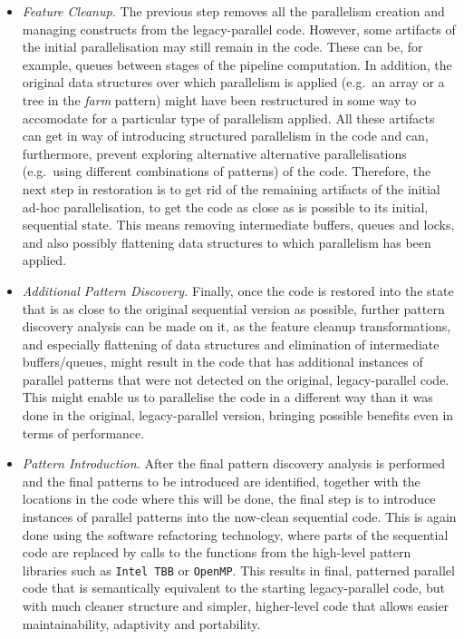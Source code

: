 \begin{itemize}
\item \emph{Feature Cleanup.} The previous step removes all the parallelism creation and managing constructs from the legacy-parallel code. However, some artifacts of the initial parallelisation may still remain in the code. These can be, for example, queues between stages of the pipeline computation. In addition, the original data structures over which parallelism is applied (e.g.~an array or a tree in the \emph{farm} pattern) might have been restructured in some way to accomodate for a particular type of parallelism applied. All these artifacts can get in way of introducing structured parallelism in the code and can, furthermore, prevent exploring alternative alternative parallelisations (e.g.~using different combinations of patterns) of the code. Therefore, the next step in restoration is to get rid of the remaining artifacts of the initial ad-hoc parallelisation, to get the code as close as is possible to its initial, sequential state. This means removing intermediate buffers, queues and locks, and also possibly flattening data structures to which parallelism has been applied. 
  
\item \emph{Additional Pattern Discovery.} Finally, once the code is restored into the state that is as close to the original sequential version as possible, further pattern discovery analysis can be made on it, as the feature cleanup transformations, and especially flattening of data structures and elimination of intermediate buffers/queues, might result in the code that has additional instances of parallel patterns that were not detected on the original, legacy-parallel code. This might enable us to parallelise the code in a different way than it was done in the original, legacy-parallel version, bringing possible benefits even in terms of performance.

\item \emph{Pattern Introduction.} After the final pattern discovery analysis is performed and the final patterns to be introduced are identified, together with the locations in the code where this will be done, the final step is to introduce instances of parallel patterns into the now-clean sequential code. This is again done using the software refactoring technology, where parts of the sequential code are replaced by calls to the functions from the high-level pattern libraries such as \lstinline{Intel TBB} or \lstinline{OpenMP}. This results in final, patterned parallel code that is semantically equivalent to the starting legacy-parallel code, but with much cleaner structure and simpler, higher-level code that allows easier maintainability, adaptivity and portability.
\end{itemize}

